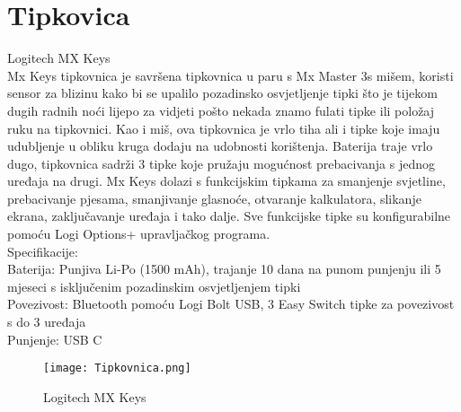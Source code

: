 \documentclass{report}
\begin{document}
\chapter{Tipkovica}
Logitech MX Keys
\\Mx Keys tipkovnica je savršena tipkovnica u paru s Mx Master 3s mišem, koristi sensor za blizinu kako bi se upalilo pozadinsko osvjetljenje tipki što je tijekom dugih radnih noći lijepo za vidjeti pošto nekada znamo fulati tipke ili položaj ruku na tipkovnici. Kao i miš, ova tipkovnica je vrlo tiha ali i tipke koje imaju udubljenje u obliku kruga dodaju na udobnosti korištenja. Baterija traje vrlo dugo, tipkovnica sadrži 3 tipke koje pružaju mogućnost prebacivanja s jednog uređaja na drugi. Mx Keys dolazi s funkcijskim tipkama za smanjenje svjetline, prebacivanje pjesama, smanjivanje glasnoće, otvaranje kalkulatora, slikanje ekrana, zaključavanje uređaja i tako dalje. Sve funkcijske tipke su konfigurabilne pomoću Logi Options+ upravljačkog programa.
\\Specifikacije:
\\Baterija: Punjiva Li-Po (1500 mAh), trajanje 10 dana na punom punjenju ili 5 mjeseci s isključenim pozadinskim osvjetljenjem tipki
\\Povezivost: Bluetooth pomoću Logi Bolt USB, 3 Easy Switch tipke za povezivost s do 3 uređaja
\\Punjenje: USB C
\begin{figure}[h]
\texttt{[image: Tipkovnica.png]}
\caption{Logitech MX Keys}
\end{figure}
\end{document}
